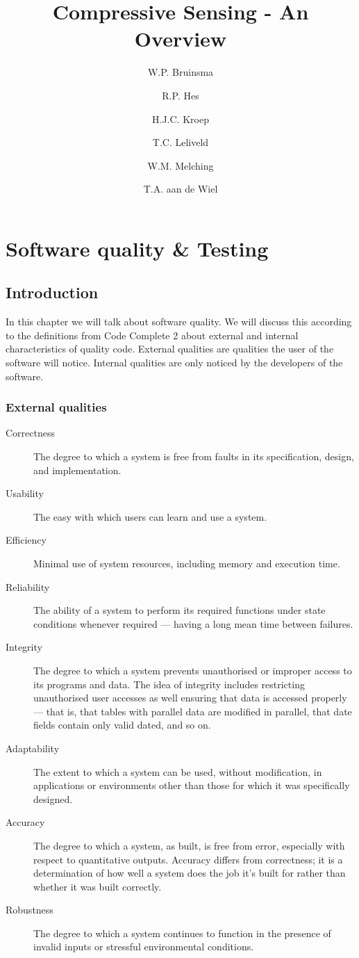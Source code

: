 \documentclass[a4paper, openany, oneside]{memoir}
\title{Compressive Sensing - An Overview}
\author{W.P. Bruinsma \and R.P. Hes \and H.J.C. Kroep \and T.C. Leliveld \and W.M. Melching \and T.A. aan de Wiel}
\begin{document}
\chapter{Software quality \& Testing}
\section{Introduction}
In this chapter we will talk about software quality. We will discuss this according to the definitions from Code Complete 2\cite{mcconnell2004code} about external and internal characteristics of quality code. External qualities are qualities the user of the software will notice. Internal qualities are only noticed by the developers of the software.

\subsection{External qualities}
\begin{description}
\item[Correctness] The degree to which a system is free from faults in its specification, design, and implementation.
\item[Usability] The easy with which users can learn and use a system.
\item[Efficiency] Minimal use of system resources, including memory and execution time.
\item[Reliability] The ability of a system to perform its required functions under state conditions whenever required --- having a long mean time between failures.
\item[Integrity] The degree to which a system prevents unauthorised or improper access to its programs and data. The idea of integrity includes restricting unauthorised user accesses as well ensuring that data is accessed properly --- that is, that tables with parallel data are modified in parallel, that date fields contain only valid dated, and so on.
\item[Adaptability] The extent to which a system can be used, without modification, in applications or environments other than those for which it was specifically designed.
\item[Accuracy] The degree to which a system, as built, is free from error, especially with respect to quantitative outputs. Accuracy differs from correctness; it is a determination of how well a system does the job it's built for rather than whether it was built correctly.
\item[Robustness] The degree to which a system continues to function in the presence of invalid inputs or stressful environmental conditions.
\end{description}
\end{document}
